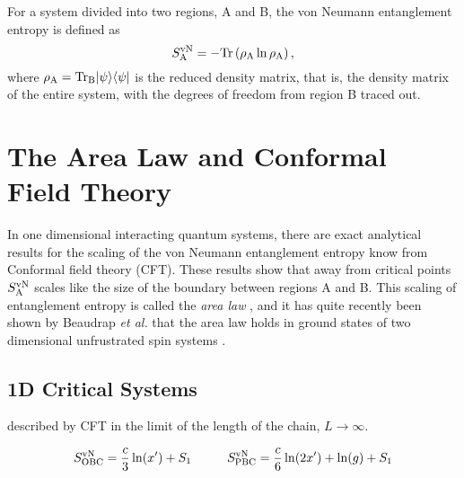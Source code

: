 For a system divided into two regions, A and B, the von Neumann entanglement entropy is defined as
\begin{equation}
	S^{\text{vN}}_\text{A} = -\rm{Tr}\left({\rho_A \ln \rho_A}\right),
\end{equation}
where $\rho_{\rm{A}}=\rm{Tr}_B\lvert {\psi} \rangle\langle {\psi} \rvert$ is the reduced density matrix, that is, the density matrix of the entire system, with the degrees of freedom from region B traced out.
\section{The Area Law and Conformal Field Theory}
In one dimensional interacting quantum systems, there are exact analytical results for the scaling of the von Neumann entanglement entropy know from Conformal field theory (CFT).
These results show that away from critical points $S^{\text{vN}}_\text{A}$ scales like the size of the boundary between regions A and B.  This scaling of entanglement entropy is called the {\it area law} \cite{Shredder}, and it has quite recently been shown by Beaudrap {\it et al.} that the area law holds in ground states of two dimensional unfrustrated spin systems \cite{DeBeaudrap2010}.




\subsection{1D Critical Systems}
\label{1dcft}

\cite{Cardy} \cite{Zhou2006}

described by CFT in the limit of the length of the chain, $L \rightarrow \infty$.

\begin{equation} \label{cft1d}
	S^{\text{vN}}_{\text{OBC}} = \frac{c}{3}\ln(x') + S_1
	\hspace{1cm}
	S^{\text{vN}}_{\text{PBC}} = \frac{c}{6}\ln(2x') + \ln(g)+ S_1
\end{equation}




